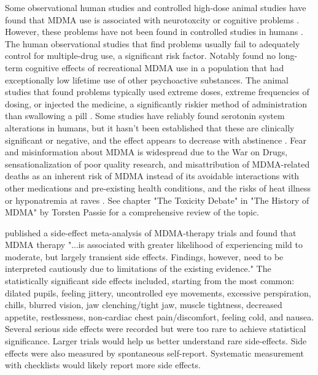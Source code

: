 \documentclass[12pt,letterpaper]{article}
\begin{document}
Some observational human studies and controlled high-dose animal studies have found that MDMA use is associated with neurotoxcity or cognitive problems \cite{passieHistory}. However, these problems have not been found in controlled studies in humans \cite{halpernMormonRavers}. The human observational studies that find problems usually fail to adequately control for multiple-drug use, a significant risk factor. Notably \textcite{halpernMormonRavers} found no long-term cognitive effects of recreational MDMA use in a population that had exceptionally low lifetime use of other psychoactive substances. The animal studies that found problems typically used extreme doses, extreme frequencies of dosing, or injected the medicine, a significantly riskier method of administration than swallowing a pill \cite{passieHistory}. Some studies have reliably found serotonin system alterations in humans, but it hasn't been established that these are clinically significant or negative, and the effect appears to decrease with abstinence \cite{gouzoulis2006neurotoxicity}. Fear and misinformation about MDMA is widespread due to the War on Drugs, sensationalization of poor quality research, and misattribution of MDMA-related deaths as an inherent risk of MDMA instead of its avoidable interactions with other medications and pre-existing health conditions, and the risks of heat illness or hyponatremia at raves \cite{passieHistory}. See chapter "The Toxicity Debate" in "The History of MDMA" by Torsten Passie for a comprehensive review of the topic.

\textcite{colcott2024side} published a side-effect meta-analysis of MDMA-therapy trials and found that MDMA therapy "...is associated with greater likelihood of experiencing mild to moderate, but largely transient side effects. Findings, however, need to be interpreted cautiously due to limitations of the existing evidence." The statistically significant side effects included, starting from the most common: dilated pupils, feeling jittery, uncontrolled eye movements, excessive perspiration, chills, blurred vision, jaw clenching/tight jaw, muscle tightness, decreased appetite, restlessness, non-cardiac chest pain/discomfort, feeling cold, and nausea. Several serious side effects were recorded but were too rare to achieve statistical significance. Larger trials would help us better understand rare side-effects. Side effects were also measured by spontaneous self-report. Systematic measurement with checklists would likely report more side effects.
\end{document}
